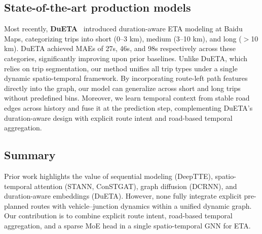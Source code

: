 \subsection{State-of-the-art production models}
Most recently, \textbf{DuETA}~\cite{dueta2023} introduced duration-aware ETA modeling at Baidu Maps, categorizing trips into short (0--3 km), medium (3--10 km), and long ($>$10 km). DuETA achieved MAEs of 27s, 46s, and 98s respectively across these categories, significantly improving upon prior baselines. Unlike DuETA, which relies on trip segmentation, our method unifies all trip types under a single dynamic spatio-temporal framework. By incorporating route-left path features directly into the graph, our model can generalize across short and long trips without predefined bins. Moreover, we learn temporal context from stable road edges across history and fuse it at the prediction step, complementing DuETA's duration-aware design with explicit route intent and road-based temporal aggregation.

\subsection{Summary}
Prior work highlights the value of sequential modeling (DeepTTE), spatio-temporal attention (STANN, ConSTGAT), graph diffusion (DCRNN), and duration-aware embeddings (DuETA). However, none fully integrate explicit pre-planned routes with vehicle–junction dynamics within a unified dynamic graph. Our contribution is to combine explicit route intent, road-based temporal aggregation, and a sparse MoE head in a single spatio-temporal GNN for ETA.
